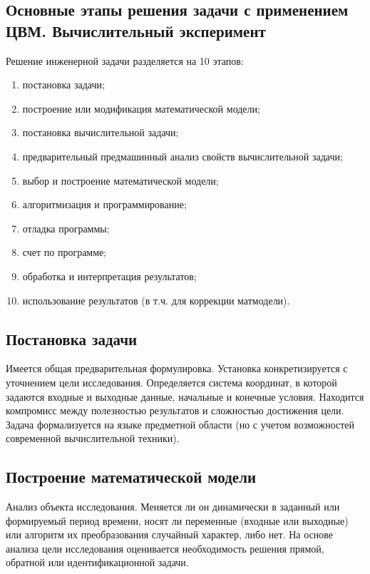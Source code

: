 \documentclass[12pt]{article}
\begin{document}
\subsection{Основные этапы решения задачи с применением ЦВМ. Вычислительный эксперимент}
Решение инженерной задачи разделяется на 10 этапов:
\begin{enumerate}
    \item постановка задачи;
    \item построение или модификация математической модели;
    \item постановка вычислительной задачи;
    \item предварительный предмашинный анализ свойств вычислительной задачи;
    \item выбор и построение математической модели;
    \item алгоритмизация и программирование;
    \item отладка программы;
    \item счет по программе;
    \item обработка и интерпретация результатов;
    \item использование результатов (в т.ч. для коррекции матмодели).
\end{enumerate}

\subsection{Постановка задачи}
Имеется общая предварительная формулировка. Установка конкретизируется с уточнением цели исследования. Определяется система координат, в которой задаются входные и выходные данные, начальные и конечные условия. Находится компромисс между полезностью результатов и сложностью достижения цели. Задача формализуется на языке предметной области (но с учетом возможностей современной вычислительной техники).

\subsection{Построение математической модели}
Анализ объекта исследования. Меняется ли он динамически в заданный или формируемый период времени, носят ли переменные (входные или выходные) или алгоритм их преобразования случайный характер, либо нет. На основе анализа цели исследования оценивается необходимость решения прямой, обратной или идентификационной задачи.
\end{document}
